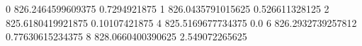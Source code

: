 0 826.2464599609375 0.7294921875
1 826.0435791015625 0.526611328125
2 825.6180419921875 0.10107421875
4 825.5169677734375 0.0
6 826.2932739257812 0.77630615234375
8 828.0660400390625 2.549072265625
